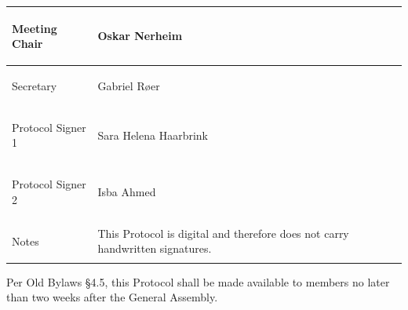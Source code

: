 \documentclass{../../Common/Latex/Templates/rapport}
\begin{document}
\rule{0pt}{3cm}

\begin{tabularx}{\textwidth}{|>{\bfseries\raggedright\arraybackslash}p{5cm}|X|}
  \hline
  Meeting Chair     & \rule{0pt}{1.4cm}Oskar Nerheim                                                \\
  \hline
  Secretary         & \rule{0pt}{1.4cm}Gabriel Røer                                                 \\
  \hline
  Protocol Signer 1 & \rule{0pt}{1.4cm}Sara Helena Haarbrink                                        \\
  \hline
  Protocol Signer 2 & \rule{0pt}{1.4cm}Isba Ahmed                                                   \\
  \hline
  Notes             & This Protocol is digital and therefore does not carry handwritten signatures. \\
  \hline
\end{tabularx}

\vspace{0.4cm}
Per Old Bylaws \S4.5, this Protocol shall be made available to members no later than two weeks after the General Assembly.
\end{document}
